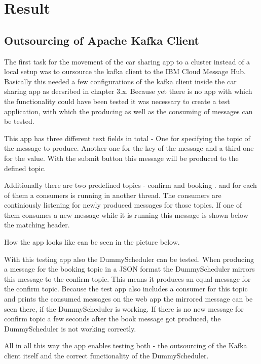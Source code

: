 
\chapter{Result}

\section{Outsourcing of Apache Kafka Client}

The first task for the movement of the car sharing app to a cluster instead of a local setup was to oursource the kafka client to the IBM Cloud Message Hub. Basically this needed a few configurations of the kafka client inside the car sharing app as decsribed in chapter 3.x. Because yet there is no app with which the functionality could have been tested it was necessary to create a test application, with which the producing as well as the consuming of messages can be tested.

This app has three different text fields in total - One for specifying the topic of the message to produce. Another one for the key of the message and a third one for the value. With the submit button this message will be produced to the defined topic.

Additionally there are two predefined topics - confirm and booking . and for each of them a consumers is running in another thread. The consumers are continiously listening for newly produced messages for those topics. If one of them consumes a new message while it is running this message is shown below the matching header.

How the app looks like can be seen in the picture below.


With this testing app also the DummyScheduler can be tested. When producing a message for the booking topic in a JSON format the DummyScheduler mirrors this message to the confirm topic. This means it produces an equal message for the confirm topic. Because the test app also includes a consumer for this topic and prints the consumed messages on the web app the mirrored message can be seen there, if the DummyScheduler is working. If there is no new message for confirm topic a few seconds after the book message got produced, the DummyScheduler is not working correctly.

All in all this way the app enables testing both - the outsourcing of the Kafka client itself and the correct functionality of the DummyScheduler.

